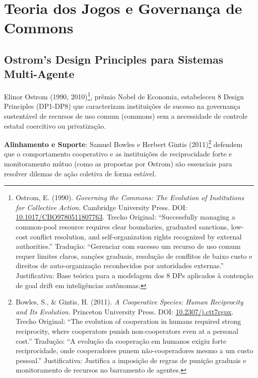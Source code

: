 \documentclass[12pt,a4paper,oneside]{abntex2}
\begin{document}
\section{Teoria dos Jogos e Governança de Commons}

\subsection{Ostrom's Design Principles para Sistemas Multi-Agente}

Elinor Ostrom (1990, 2010)\footnote{Ostrom, E. (1990). \textit{Governing the Commons: The Evolution of Institutions for Collective Action}. Cambridge University Press. DOI: \href{https://doi.org/10.1017/CBO9780511807763}{10.1017/CBO9780511807763}. Trecho Original: ``Successfully managing a common-pool resource requires clear boundaries, graduated sanctions, low-cost conflict resolution, and self-organization rights recognized by external authorities.'' Tradução: ``Gerenciar com sucesso um recurso de uso comum requer limites claros, sanções graduais, resolução de conflitos de baixo custo e direitos de auto-organização reconhecidos por autoridades externas.'' Justificativa: Base teórica para a modelagem dos 8 DPs aplicados à contenção de goal drift em inteligências autônomas.}, prêmio Nobel de Economia, estabeleceu 8 Design Principles (DP1-DP8) que caracterizam instituições de sucesso na governança sustentável de recursos de uso comum (commons) sem a necessidade de controle estatal coercitivo ou privatização.

\textbf{Alinhamento e Suporte}: Samuel Bowles e Herbert Gintis (2011)\footnote{Bowles, S., \& Gintis, H. (2011). \textit{A Cooperative Species: Human Reciprocity and Its Evolution}. Princeton University Press. DOI: \href{https://doi.org/10.2307/j.ctt7rgpx}{10.2307/j.ctt7rgpx}. Trecho Original: ``The evolution of cooperation in humans required strong reciprocity, where cooperators punish non-cooperators even at a personal cost.'' Tradução: ``A evolução da cooperação em humanos exigiu forte reciprocidade, onde cooperadores punem não-cooperadores mesmo a um custo pessoal.'' Justificativa: Justifica a imposição de regras de punição graduais e monitoramento de recursos no barramento de agentes.} defendem que o comportamento cooperativo e as instituições de reciprocidade forte e monitoramento mútuo (como as propostas por Ostrom) são essenciais para resolver dilemas de ação coletiva de forma estável.
\end{document}
